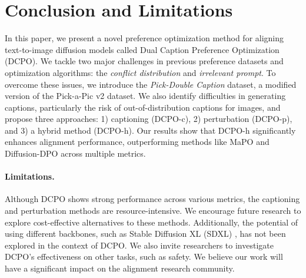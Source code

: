 \section{Conclusion and Limitations}
In this paper, we present a novel preference optimization method for aligning text-to-image diffusion models called Dual Caption Preference Optimization (DCPO). We tackle two major challenges in previous preference datasets and optimization algorithms: the \textit{conflict distribution} and \textit{irrelevant prompt}. To overcome these issues, we introduce the \textit{Pick-Double Caption} dataset, a modified version of the Pick-a-Pic v2 dataset. We also identify difficulties in generating captions, particularly the risk of out-of-distribution captions for images, and propose three approaches: 1) captioning (DCPO-c), 2) perturbation (DCPO-p), and 3) a hybrid method (DCPO-h). Our results show that DCPO-h significantly enhances alignment performance, outperforming methods like MaPO and Diffusion-DPO across multiple metrics.

\paragraph{Limitations.} Although DCPO shows strong performance across various metrics, the captioning and perturbation methods are resource-intensive. We encourage future research to explore cost-effective alternatives to these methods. Additionally, the potential of using different backbones, such as Stable Diffusion XL (SDXL) \citep{rombach2022high}, has not been explored in the context of DCPO. We also invite researchers to investigate DCPO's effectiveness on other tasks, such as safety. We believe our work will have a significant impact on the alignment research community.